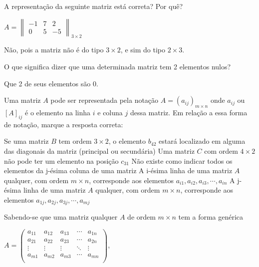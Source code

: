 \documentclass[pdftex, brazil, 12pt, oneside, addpoints, answers]{exam}
\begin{document}
\begin{questions}
\question
A representação da seguinte matriz está correta? Por quê?

$A = \begin{Vmatrix}
  -1 & 7 & 2\\
  0 & 5 & -5\end{Vmatrix}_{3 \times 2}$
\begin{solutionorlines}[0.50in]
  Não, pois a matriz não é do tipo $3 \times 2$, e sim do tipo
  $2 \times 3$.
\end{solutionorlines}

\question
O que significa dizer que uma determinada matriz tem 2 elementos nulos?
\begin{solutionorlines}[0.50in]
  Que 2 de seus elementos são $0$.
\end{solutionorlines}

\question
Uma matriz $A$ pode ser representada pela notação $A = (a_{ij})_{m \times n}$
onde $a_{ij}$ ou $[A]_{ij}$ é o elemento na linha $i$ e coluna $j$ dessa
matriz. Em relação a essa forma de notação, marque a resposta correta:
\begin{checkboxes}
  \choice Se uma matriz $B$ tem ordem $3 \times 2$, o elemento $b_{42}$ estará
  localizado em alguma das diagonais da matriz (principal ou secundária)
  \choice Uma matriz $C$ com ordem $4 \times 2$ não pode ter um elemento
  na posição $c_{31}$
  \choice Não existe como indicar todos os elementos da j-ésima coluna de uma matriz
  \CorrectChoice A i-ésima linha de uma matriz $A$ qualquer, com ordem $m \times n$, corresponde aos
  elementos $a_{i1}, a_{i2}, a_{i3}, \cdots, a_{in}$
  \choice A j-ésima linha de uma matriz $A$ qualquer, com ordem $m \times n$, corresponde aos
  elementos $a_{1j}, a_{2j}, a_{3j}, \cdots, a_{mj}$
\end{checkboxes}

\ifprintanswers
\newpage
\else
\newpage
\fi

\question
Sabendo-se que uma matriz qualquer $A$ de ordem $m \times n$ tem a forma
genérica

$A = \begin{pmatrix}
  a_{11} & a_{12} & a_{13} & \cdots & a_{1n}\\
  a_{21} & a_{22} & a_{23} & \cdots & a_{2n}\\
  \vdots & \vdots & \vdots & \ddots & \vdots\\
  a_{m1} & a_{m2} & a_{m3} & \cdots & a_{mn}\\
\end{pmatrix}$,


\end{questions}
\end{document}
